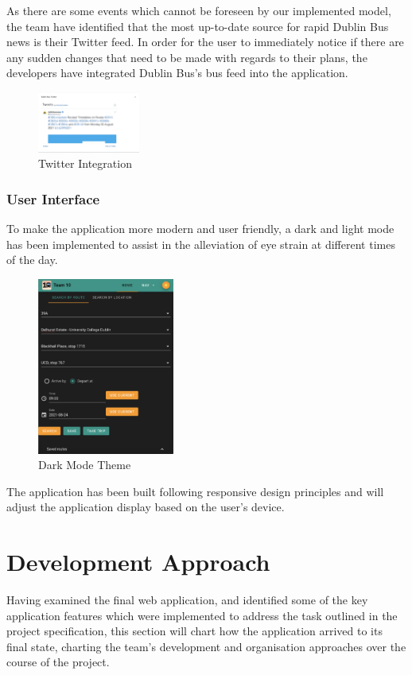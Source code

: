 \documentclass[]{UCD_CS_47360_Report}
\begin{document}
As there are some events which cannot be foreseen by our implemented model, the team have identified that the most up-to-date source for rapid Dublin Bus news is their Twitter feed. In order for the user to immediately notice if there are any sudden changes that need to be made with regards to their plans, the developers have integrated Dublin Bus's bus feed into the application.
\begin{figure}[!htb]
    \centering
    \includegraphics[width=0.3\textwidth]{figures/2_5_Tweets.png}
    \caption{Twitter Integration}
    \label{fig:Tweet}
\end{figure}

\subsection{User Interface}

To make the application more modern and user friendly, a dark and light mode has been implemented to assist in the alleviation of eye strain at different times of the day. 
\begin{figure}[!htb]
    \centering
    \includegraphics[width=0.4\textwidth]{figures/2_7_DarkMode.png}
    \caption{Dark Mode Theme}
    \label{fig:DarkModeTheme}
\end{figure}

The application has been built following responsive design principles and will adjust the application display based on the user's device.

\chapter{\label{chapter3}Development Approach}
Having examined the final web application, and identified some of the key application features which were implemented to address the task outlined in the project specification, this section will chart how the application arrived to its final state, charting the team's development and organisation approaches over the course of the project. 
\end{document}
